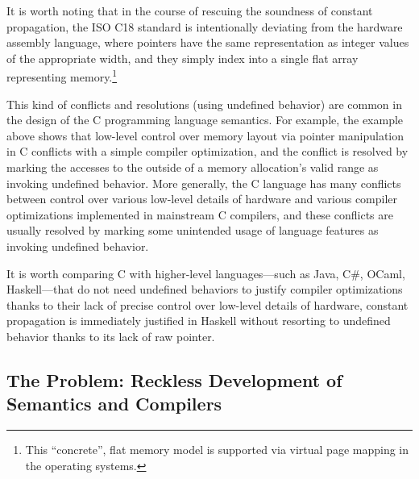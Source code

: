 It is worth noting that in the course of rescuing the soundness of constant propagation, the ISO C18
standard is intentionally deviating from the hardware assembly language, where pointers have the
same representation as integer values of the appropriate width, and they simply index into a single
flat array representing memory.\footnote{This ``concrete'', flat memory model is supported via
  virtual page mapping in the operating systems.}


This kind of conflicts and resolutions (using undefined behavior) are common in the design of the C
programming language semantics.  For example, the example above shows that low-level control over
memory layout via pointer manipulation in C conflicts with a simple compiler optimization, and the
conflict is resolved by marking the accesses to the outside of a memory allocation's valid range as
invoking undefined behavior.  More generally, the C language has many conflicts between control over
various low-level details of hardware and various compiler optimizations implemented in mainstream C
compilers, and these conflicts are usually resolved by marking some unintended usage of language
features as invoking undefined behavior.

It is worth comparing C with higher-level languages---such as Java, C\#, OCaml, Haskell---that do
not need undefined behaviors to justify compiler optimizations thanks to their lack of precise
control over low-level details of hardware, \eg{} constant propagation is immediately justified in
Haskell without resorting to undefined behavior thanks to its lack of raw pointer.




\subsection{The Problem: Reckless Development of Semantics and Compilers}
\label{sec:introduction:problem}

